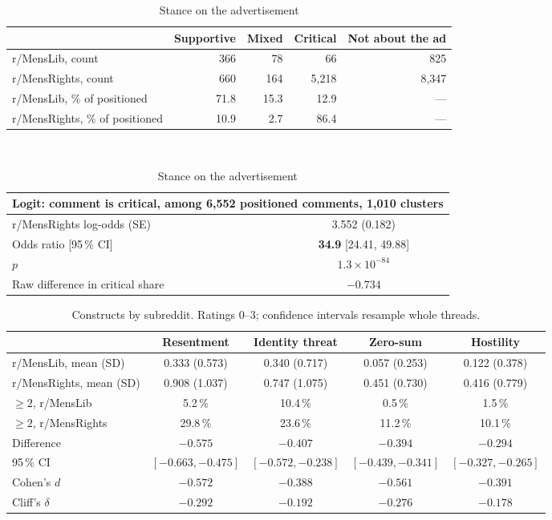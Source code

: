 \documentclass[11pt,a4paper]{article}
\begin{document}
\begin{table}[h]
\centering\small
\caption{Stance on the advertisement}\label{tab:stance}
\begin{tabular}{lrrrr}
\toprule
& Supportive & Mixed & Critical & Not about the ad \\
\midrule
r/MensLib, count              & 366 & 78  & 66       & 825 \\
r/MensRights, count           & 660 & 164 & 5{,}218  & 8{,}347 \\
r/MensLib, \% of positioned   & 71.8 & 15.3 & 12.9 & --- \\
r/MensRights, \% of positioned & 10.9 & 2.7 & 86.4 & --- \\
\bottomrule
\end{tabular}
\\[0.6em]
\begin{tabular}{lc}
\multicolumn{2}{l}{\footnotesize Logit: comment is critical, among 6{,}552 positioned comments, 1{,}010 clusters} \\
\toprule
r/MensRights log-odds (SE) & 3.552 (0.182) \\
Odds ratio [95\,\% CI]     & \textbf{34.9} [24.41, 49.88] \\
$p$                        & $1.3\times10^{-84}$ \\
Raw difference in critical share & $-0.734$ \\
\bottomrule
\end{tabular}
\end{table}

\begin{table}[h]
\centering\small
\caption{Constructs by subreddit. Ratings 0--3; confidence intervals resample whole threads.}
\begin{tabular}{lcccc}
\toprule
& Resentment & Identity threat & Zero-sum & Hostility \\
\midrule
r/MensLib, mean (SD)     & 0.333 (0.573) & 0.340 (0.717) & 0.057 (0.253) & 0.122 (0.378) \\
r/MensRights, mean (SD)  & 0.908 (1.037) & 0.747 (1.075) & 0.451 (0.730) & 0.416 (0.779) \\
$\geq 2$, r/MensLib      & 5.2\,\%  & 10.4\,\% & 0.5\,\%  & 1.5\,\% \\
$\geq 2$, r/MensRights   & 29.8\,\% & 23.6\,\% & 11.2\,\% & 10.1\,\% \\
Difference               & $-0.575$ & $-0.407$ & $-0.394$ & $-0.294$ \\
95\,\% CI                & $[-0.663, -0.475]$ & $[-0.572, -0.238]$ & $[-0.439, -0.341]$ & $[-0.327, -0.265]$ \\
Cohen's $d$              & $-0.572$ & $-0.388$ & $-0.561$ & $-0.391$ \\
Cliff's $\delta$         & $-0.292$ & $-0.192$ & $-0.276$ & $-0.178$ \\
\bottomrule
\end{tabular}
\end{table}
\end{document}

